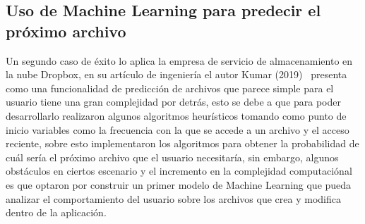 \documentclass[9pt,a4paper,twoside]{rho-class/rho}
\begin{document}
        \subsection{Uso de Machine Learning para predecir el próximo archivo}
        Un segundo caso de éxito lo aplica la empresa de servicio de almacenamiento en la nube Dropbox, en su artículo de ingeniería el autor Kumar (2019)~\cite{Kumar2019} presenta como una funcionalidad de predicción de archivos que parece simple para el usuario tiene una gran complejidad por detrás, esto se debe a que para poder desarrollarlo realizaron algunos algoritmos heurísticos tomando como punto de inicio variables como la frecuencia con la que se accede a un archivo y el acceso reciente, sobre esto implementaron los algoritmos para obtener la probabilidad de cuál sería el próximo archivo que el usuario necesitaría, sin embargo, algunos obstáculos en ciertos escenario y el incremento en la complejidad computaciónal es que optaron por construir un primer modelo de Machine Learning que pueda analizar el comportamiento del usuario sobre los archivos que crea y modifica dentro de la aplicación.

\end{document}
